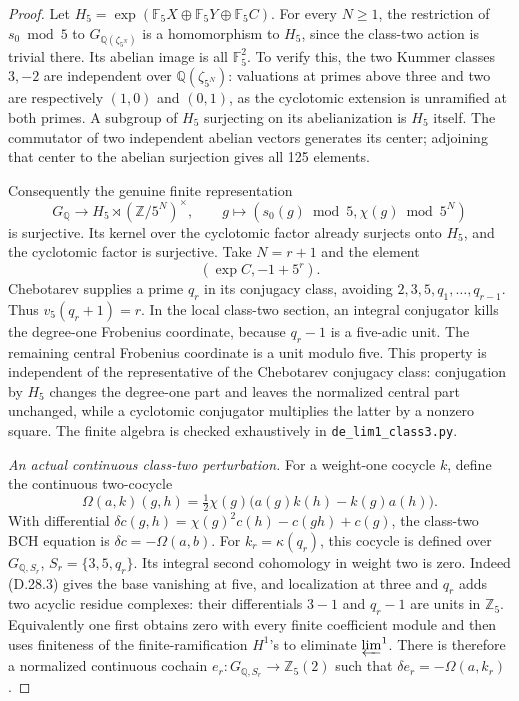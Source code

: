 \begin{proof}
Let \(H_5=\exp(\mathbb F_5X\oplus
\mathbb F_5Y\oplus\mathbb F_5C)\).
For every \(N\ge1\), the restriction
of \(s_0\bmod5\) to
\(G_{\mathbb Q(\zeta_{5^N})}\) is a
homomorphism to \(H_5\), since the
class-two action is trivial there.
Its abelian image is all \(\mathbb F_5^2\).
To verify this, the two Kummer classes
\(3,-2\) are independent over
\(\mathbb Q(\zeta_{5^N})\): valuations
at primes above three and two are
respectively \((1,0)\) and \((0,1)\),
as the cyclotomic extension is unramified
at both primes. A subgroup of \(H_5\)
surjecting on its abelianization is
\(H_5\) itself. The commutator of two
independent abelian vectors generates
its center; adjoining that center to
the abelian surjection gives all 125
elements.

Consequently the genuine finite
representation
\[
 G_{\mathbb Q}\longrightarrow
 H_5\rtimes(\mathbb Z/5^N)^\times,
 \qquad g\longmapsto(s_0(g)\bmod5,\chi(g)\bmod5^N)
                                                               \tag{D.28.5}
\]
is surjective. Its kernel over the
cyclotomic factor already surjects onto
\(H_5\), and the cyclotomic factor is
surjective. Take \(N=r+1\) and the
element
\[
                  (\exp C,-1+5^r).
                                                               \tag{D.28.6}
\]
Chebotarev supplies a prime \(q_r\)
in its conjugacy class, avoiding
\(2,3,5,q_1,\ldots,q_{r-1}\).
Thus \(v_5(q_r+1)=r\). In the local
class-two section, an integral conjugator
kills the degree-one Frobenius coordinate,
because \(q_r-1\) is a five-adic unit.
The remaining central Frobenius coordinate
is a unit modulo five. This property is
independent of the representative of the
Chebotarev conjugacy class: conjugation
by \(H_5\) changes the degree-one part
and leaves the normalized central part
unchanged, while a cyclotomic conjugator
multiplies the latter by a nonzero square.
The finite algebra is checked exhaustively
in \texttt{de\_lim1\_class3.py}.

\emph{An actual continuous class-two perturbation.}
For a weight-one cocycle \(k\), define
the continuous two-cocycle
\[
 \Omega(a,k)(g,h)=\tfrac12\chi(g)
                    \bigl(a(g)k(h)-k(g)a(h)\bigr).
                                                               \tag{D.28.7}
\]
With differential
\(\delta c(g,h)=\chi(g)^2c(h)-c(gh)+c(g)\),
the class-two BCH equation is
\(\delta c=-\Omega(a,b)\).
For \(k_r=\kappa(q_r)\), this cocycle
is defined over
\(G_{\mathbb Q,S_r}\),
\(S_r=\{3,5,q_r\}\). Its integral
second cohomology in weight two is zero.
Indeed (D.28.3) gives the base vanishing
at five, and localization at three and
\(q_r\) adds two acyclic residue complexes:
their differentials \(3-1\) and
\(q_r-1\) are units in \(\mathbb Z_5\).
Equivalently one first obtains zero with
every finite coefficient module and then
uses finiteness of the finite-ramification
\(H^1\)'s to eliminate \(\varprojlim^1\).
There is therefore a normalized continuous
cochain \(e_r:G_{\mathbb Q,S_r}\to\mathbb Z_5(2)\)
such that \(\delta e_r=-\Omega(a,k_r)\).


\end{proof}
